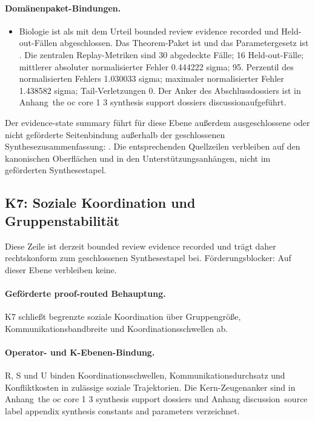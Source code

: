 \paragraph{Domänenpaket-Bindungen.}
\begin{itemize}[leftmargin=1.6em,nosep]
\item Biologie ist als  mit dem Urteil bounded review evidence recorded und  Held-out-Fällen abgeschlossen. Das Theorem-Paket ist  und das Parametergesetz ist . Die zentralen Replay-Metriken sind 30 abgedeckte Fälle; 16 Held-out-Fälle; mittlerer absoluter normalisierter Fehler 0.444222 sigma; 95. Perzentil des normalisierten Fehlers 1.030033 sigma; maximaler normalisierter Fehler 1.438582 sigma; Tail-Verletzungen 0. Der Anker des Abschlussdossiers ist in Anhang~the oc core 1 3 synthesis support dossiers discussionaufgeführt.
\end{itemize}
Der evidence-state summary führt für diese Ebene außerdem  ausgeschlossene oder nicht geförderte Seitenbindung außerhalb der geschlossenen Synthesezusammenfassung: . Die entsprechenden Quellzeilen verbleiben auf den kanonischen Oberflächen und in den Unterstützungsanhängen, nicht im geförderten Synthesestapel.

\subsection{K7: Soziale Koordination und Gruppenstabilität}
\label{sec:oc-core-1-3-synthesis-k7}
Diese Zeile ist derzeit bounded review evidence recorded und trägt daher rechtskonform zum geschlossenen Synthesestapel bei.
Förderungsblocker: Auf dieser Ebene verbleiben keine.

\paragraph{Geförderte proof-routed Behauptung.}
K7 schließt begrenzte soziale Koordination über Gruppengröße, Kommunikationsbandbreite und Koordinationsschwellen ab.

\paragraph{Operator- und K-Ebenen-Bindung.}
R, S und U binden Koordinationsschwellen, Kommunikationsdurchsatz und Konfliktkosten in zulässige soziale Trajektorien.
Die Kern-Zeugenanker sind in Anhang~the oc core 1 3 synthesis support dossiers und Anhang discussion~source label appendix synthesis constants and parameters verzeichnet.

